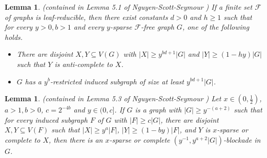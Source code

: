 \documentclass[a4paper,11pt]{article}
\newtheorem{lemma}[theorem]{Lemma}
\begin{document}
\begin{lemma}\label{lem:leaf expanding}
\textnormal{(contained in Lemma 5.1 of Nguyen-Scott-Seymour \cite{NSS232})}
    If a finite set $\mathcal{F}$ of graphs is leaf-reducible, then there exist constants $d>0$ and $h\ge 1$ such that for every $y>0,b>1$ and every $y$-sparse $\mathcal{F}$-free graph $G$, one of the following holds.
    \begin{itemize}
        \item There are disjoint $X,Y\subseteq V(G)$ with $|X|\geq y^{bd+1}|G|$ and $|Y|\geq (1-hy)|G|$ such that $Y$ is anti-complete to $X$.
        
        \item $G$ has a $y^b$-restricted induced subgraph of size at least $y^{bd+1}|G|$.
    \end{itemize}
\end{lemma}



\begin{lemma}\label{lem:get a blockade by iteration}
\textnormal{(contained in Lemma 5.3 of Nguyen-Scott-Seymour \cite{NSS23})}
Let $x\in(0,\frac{1}{2})$, $a>1, b>0$, $c=2^{-4b}$ and $y\in(0,c]$. 
If $G$ is a graph with $|G|\geq y^{-(a+2)}$ such that for every induced subgraph $F$ of $G$ with $|F|\geq c|G|$, there are disjoint $X,Y\subseteq V(F)$ such that $|X|\geq y^a|F|$, $|Y|\geq (1-by)|F|$, and $Y$ is $x$-sparse or complete to $X$, then there is an $x$-sparse or complete $(y^{-1},y^{a+2}|G|)$-blockade in $G$.
\end{lemma}
\end{document}
